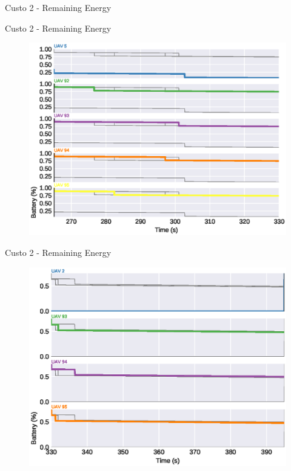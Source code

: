\begin{frame}{Custo 2 - Remaining Energy}
\begin{figure}[!htb]
                    \end{figure}
                \end{frame}\begin{frame}{Custo 2 - Remaining Energy}
                    \begin{figure}[!htb]
                        \includegraphics[width=\textwidth]{custo_2/uav_remaining_energy_330.eps}
                    \end{figure}
                \end{frame}\begin{frame}{Custo 2 - Remaining Energy}
                    \begin{figure}[!htb]
                        \includegraphics[width=\textwidth]{custo_2/uav_remaining_energy_395.eps}

\end{figure}
\end{frame}
